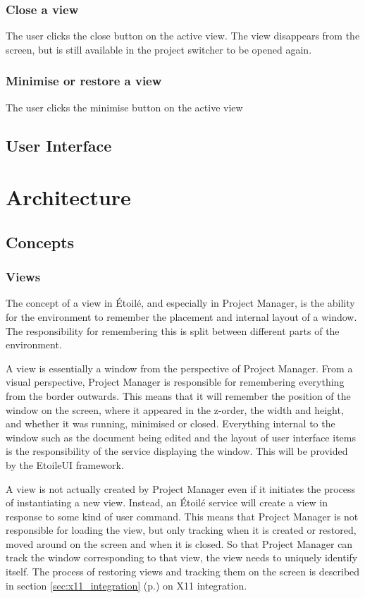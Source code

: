 \documentclass[11pt]{report}
\newcommand{\etoile}{\'Etoil\'e\xspace}
\newcommand{\proman}{Project Manager\xspace}
\begin{document}
\subsection{Close a view}
The user clicks the close button on the active view. The view disappears from the screen, but is still available in the project switcher to be opened again.

\subsection{Minimise or restore a view}
The user clicks the minimise button on the active view

\section{User Interface}

\chapter{Architecture}
\section{Concepts}
\subsection{Views}
The concept of a view in \etoile, and especially in Project Manager, is the ability for the environment to remember the placement and internal layout of a window. The responsibility for remembering this is split between different parts of the environment.

A view is essentially a window from the perspective of \proman. From a visual perspective, \proman is responsible for remembering everything from the border outwards. This means that it will remember the position of the window on the screen, where it appeared in the z-order, the width and height, and whether it was running, minimised or closed. Everything internal to the window such as the document being edited and the layout of user interface items is the responsibility of the service displaying the window. This will be provided by the EtoileUI framework.

A view is not actually created by \proman even if it initiates the process of instantiating a new view. Instead, an \etoile service will create a view in response to some kind of user command. This means that \proman is not responsible for loading the view, but only tracking when it is created or restored, moved around on the screen and when it is closed. So that \proman can track the window corresponding to that view, the view needs to uniquely identify itself. The process of restoring views and tracking them on the screen is described in section \ref{sec:x11_integration} (p.\pageref{sec:x11_integration}) on X11 integration.
\end{document}
